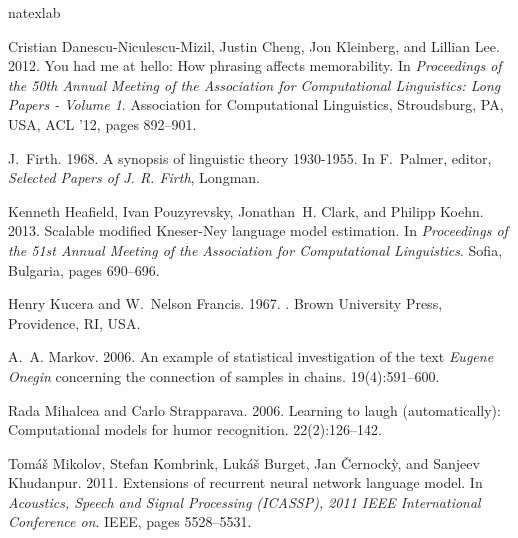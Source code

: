 \documentclass[11pt,a4paper]{article}
\begin{document}

\begin{thebibliography}{}
\expandafter\ifx\csname natexlab\endcsname\relax\def\natexlab#1{#1}\fi

Cristian Danescu-Niculescu-Mizil, Justin Cheng, Jon Kleinberg, and Lillian Lee.
  2012.
\newblock You had me at hello: How phrasing affects memorability.
\newblock In {\em Proceedings of the 50th Annual Meeting of the Association for
  Computational Linguistics: Long Papers - Volume 1\/}. Association for
  Computational Linguistics, Stroudsburg, PA, USA, ACL '12, pages 892--901.

J.~Firth. 1968.
\newblock A synopsis of linguistic theory 1930-1955.
\newblock In F.~Palmer, editor, {\em Selected Papers of J. R. Firth\/},
  Longman.

Kenneth Heafield, Ivan Pouzyrevsky, Jonathan~H. Clark, and Philipp Koehn. 2013.
\newblock Scalable modified {Kneser-Ney} language model estimation.
\newblock In {\em Proceedings of the 51st Annual Meeting of the Association for
  Computational Linguistics\/}. Sofia, Bulgaria, pages 690--696.

Henry Kucera and W.~Nelson Francis. 1967.
.
\newblock Brown University Press, Providence, RI, USA.

A.~A. Markov. 2006.
\newblock An example of statistical investigation of the text {\it Eugene
  Onegin} concerning the connection of samples in chains.
 19(4):591--600.

Rada Mihalcea and Carlo Strapparava. 2006.
\newblock Learning to laugh (automatically): Computational models for humor
  recognition.
 22(2):126--142.

Tom{\'a}{\v{s}} Mikolov, Stefan Kombrink, Luk{\'a}{\v{s}} Burget, Jan
  {\v{C}}ernock{\`y}, and Sanjeev Khudanpur. 2011.
\newblock Extensions of recurrent neural network language model.
\newblock In {\em Acoustics, Speech and Signal Processing (ICASSP), 2011 IEEE
  International Conference on\/}. IEEE, pages 5528--5531.


\end{thebibliography}
\end{document}
